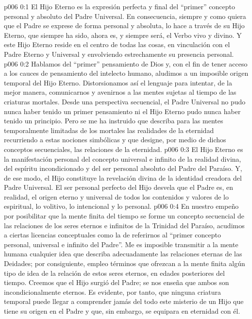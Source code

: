 \author{Consejero divino}
\vs p006 0:1 El Hijo Eterno es la expresión perfecta y final del “primer” concepto personal y absoluto del Padre Universal. En consecuencia, siempre y como quiera que el Padre se exprese de forma personal y absoluta, lo hace a través de su Hijo Eterno, que siempre ha sido, ahora es, y siempre será, el Verbo vivo y divino. Y este Hijo Eterno reside en el centro de todas las cosas, en vinculación con el Padre Eterno y Universal y envolviendo estrechamente su presencia personal.
\vs p006 0:2 Hablamos del “primer” pensamiento de Dios y, con el fin de tener acceso a los cauces de pensamiento del intelecto humano, aludimos a un imposible origen temporal del Hijo Eterno. Distorsionamos así el lenguaje para intentar, de la mejor manera, comunicarnos y avenirnos a las mentes sujetas al tiempo de las criaturas mortales. Desde una perspectiva secuencial, el Padre Universal no pudo nunca haber tenido un primer pensamiento ni el Hijo Eterno pudo nunca haber tenido un principio. Pero se me ha instruido que describa para las mentes temporalmente limitadas de los mortales las realidades de la eternidad recurriendo a estas nociones simbólicas y que designe, por medio de dichos conceptos secuenciales, las relaciones de la eternidad.
\vs p006 0:3 El Hijo Eterno es la manifestación personal del concepto universal e infinito de la realidad divina, del espíritu incondicionado y del ser personal absoluto del Padre del Paraíso. Y, de ese modo, el Hijo constituye la revelación divina de la identidad creadora del Padre Universal. El ser personal perfecto del Hijo desvela que el Padre es, en realidad, el origen eterno y universal de todos los contenidos y valores de lo espiritual, lo volitivo, lo intencional y lo personal.
\vs p006 0:4 En nuestro empeño por posibilitar que la mente finita del tiempo se forme un concepto secuencial de las relaciones de los seres eternos e infinitos de la Trinidad del Paraíso, acudimos a ciertas licencias conceptuales como la de referirnos al “primer concepto personal, universal e infinito del Padre”. Me es imposible transmitir a la mente humana cualquier idea que describa adecuadamente las relaciones eternas de las Deidades; por consiguiente, empleo términos que ofrezcan a la mente finita algún tipo de idea de la relación de estos seres eternos, en edades posteriores del tiempo. Creemos que el Hijo surgió del Padre; se nos enseña que ambos son incondicionalmente eternos. Es evidente, por tanto, que ninguna criatura temporal puede llegar a comprender jamás del todo este misterio de un Hijo que tiene su origen en el Padre y que, sin embargo, se equipara en eternidad con él.
